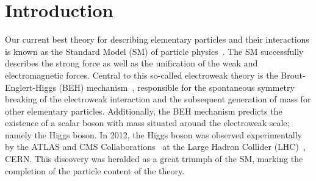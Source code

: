 \chapter{Introduction}
\label{chap:intro}



Our current best theory for describing elementary particles and their interactions is known as the Standard Model (SM) of particle physics~\cite{Glashow:1961tr,Weinberg:1967tq,Salam:1968rm}. 
The SM successfully describes the strong force as well as the unification of the weak and electromagnetic forces. Central to this so-called electroweak theory is the Brout-Englert-Higgs (BEH) mechanism~\cite{Englert:1964et,HIGGS1964132,Higgs:1964pj,Guralnik:1964eu,PhysRev.145.1156,PhysRev.155.1554}, responsible for the spontaneous symmetry breaking of the electroweak interaction and the subsequent generation of mass for other elementary particles. Additionally, the BEH mechanism predicts the existence of a scalar boson with mass situated around the electroweak scale; namely the Higgs boson. In 2012, the Higgs boson was observed experimentally~\cite{Aad:2012tfa,Chatrchyan:2012xdj,Chatrchyan:2013lba} by the ATLAS and CMS Collaborations~\cite{Aad:2008zzm,Chatrchyan:2008zzk} at the Large Hadron Collider (LHC)~\cite{1748-0221-3-08-S08001}, CERN. This discovery was heralded as a great triumph of the SM, marking the completion of the particle content of the theory.

